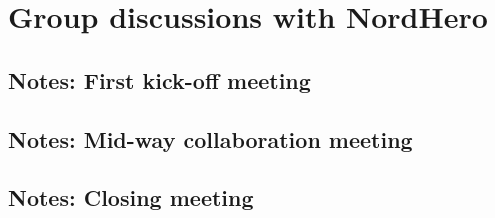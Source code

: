 \chapter{Group discussions with NordHero}

\section*{Notes: First kick-off meeting}

\section*{Notes: Mid-way collaboration meeting}

\section*{Notes: Closing meeting}
